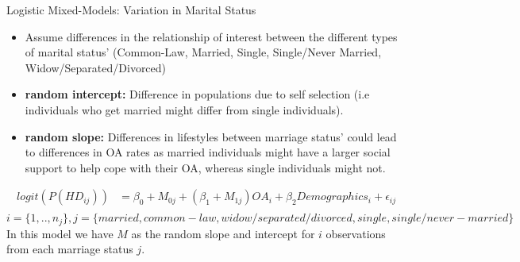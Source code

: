 \begin{frame}{Logistic Mixed-Models: Variation in Marital Status}
\begin{itemize}
    \item Assume differences in the relationship of interest between the different types of marital status' (Common-Law, Married, Single, Single/Never Married, Widow/Separated/Divorced)
    \item \textbf{random intercept: }Difference in populations due to self selection (i.e individuals who get married might differ from single individuals). 
    \item \textbf{random slope: }Differences in lifestyles between marriage status' could lead to differences in OA rates as married individuals might have a larger social support to help cope with their OA, whereas single individuals might not. 
\end{itemize}
\begin{align*}
    logit(P(HD_{ij}))&=\beta_0+M_{0j}+(\beta_1+M_{1j})OA_i +\beta_2Demographics_i+\epsilon_{ij}\\
\end{align*}
\begin{equation*}
    i=\{1,..,n_j\}, j=\{married,common-law, widow/separated/divorced, single, single/never-married\}
\end{equation*}
In this model we have $M$ as the random slope and intercept for $i$ observations from each marriage status $j$.
    
\end{frame}

